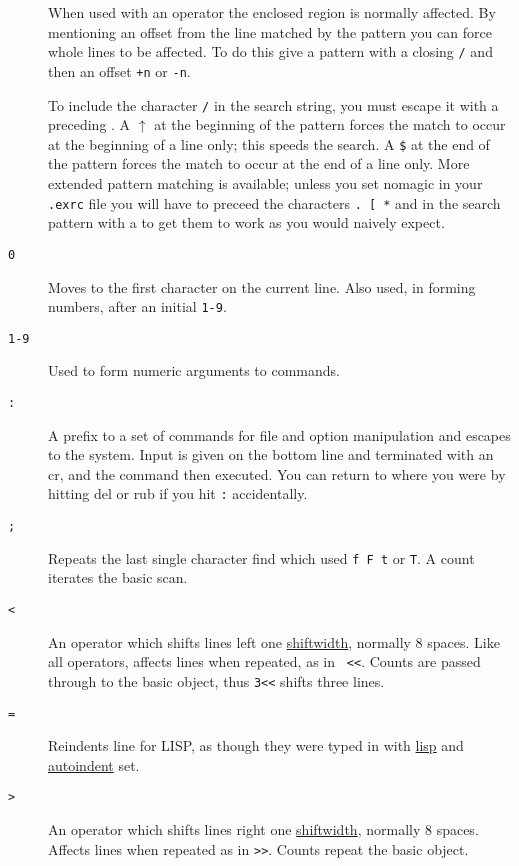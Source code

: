 \begin{description}
When used with an operator the enclosed region is normally affected. By
mentioning an offset from the line matched by the pattern you can force whole
lines to be affected. To do this give a pattern with a closing {\tt /} and
then an offset {\tt +n} or {\tt -n}.

To include the character {\tt /} in the search string, you must escape it with
a preceding {\tt{}}. A $\uparrow$ at the beginning of the pattern
forces the match to occur at the beginning of a line only; this speeds the
search. A {\tt \$} at the end of the pattern forces the match to occur at the
end of a line only. More extended pattern matching is available; unless you
set nomagic in your {\tt .exrc} file you will have to preceed the characters
{\tt .~[ *} and {\tt{}} in the search pattern with a
{\tt{}} to get them to work as you would naively expect.

\item[{\tt 0}] Moves to the first character on the current line. Also used, in
forming numbers, after an initial {\tt 1-9}.

\item[{\tt 1-9}] Used to form numeric arguments to commands.

\item[{\tt :}] A prefix to a set of commands for file and option manipulation
and escapes to the system. Input is given on the bottom line and terminated
with an {\sc cr}, and the command then executed. You can return to where you
were by hitting {\sc del} or {\sc rub} if you hit {\tt :} accidentally.

\item[{\tt ;}] Repeats the last single character find which used {\tt f F t}
or {\tt T}. A count iterates the basic scan.

\item[{\tt <}] An operator which shifts lines left one \ul{shiftwidth},
normally 8 spaces. Like all operators, affects lines when repeated, as in {\tt
<<}. Counts are passed through to the basic object, thus {\tt 3<<} shifts
three lines.

\item[{\tt =}] Reindents line for LISP, as though they were typed in with
\ul{lisp} and \ul{autoindent} set.

\item[{\tt >}] An operator which shifts lines right one \ul{shiftwidth},
normally 8 spaces. Affects lines when repeated as in {\tt >>}. Counts repeat
the basic object.


\end{description}
